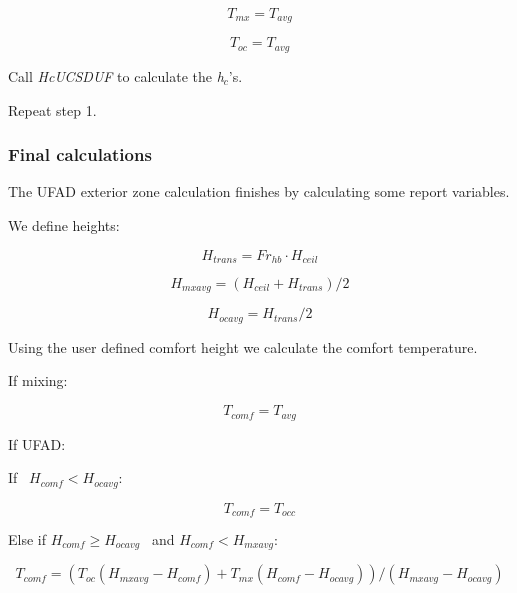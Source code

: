 \begin{equation}
{T_{mx}} = {T_{avg}}
\end{equation}

\begin{equation}
{T_{oc}} = {T_{avg}}
\end{equation}

Call \emph{HcUCSDUF} to calculate the \emph{h\(_{c}\)}'s.

Repeat step 1.

\subsubsection{Final calculations}\label{final-calculations-2}

The UFAD exterior zone calculation finishes by calculating some report variables.

We define heights:

\begin{equation}
{H_{trans}} = F{r_{hb}} \cdot {H_{ceil}}
\end{equation}

\begin{equation}
{H_{mxavg}} = \left( {{H_{ceil}} + {H_{trans}}} \right)/2
\end{equation}

\begin{equation}
{H_{ocavg}} = {H_{trans}}/2
\end{equation}

Using the user defined comfort height we calculate the comfort temperature.

If mixing:

\begin{equation}
{T_{comf}} = {T_{avg}}
\end{equation}

If UFAD:

If~ \({H_{comf}} < {H_{ocavg}}\):

\begin{equation}
{T_{comf}} = {T_{occ}}
\end{equation}

Else if \({H_{comf}} \ge {H_{ocavg}}\) ~and \({H_{comf}} < {H_{mxavg}}\):

\begin{equation}
{T_{comf}} = \left( {{T_{oc}}\left( {{H_{mxavg}} - {H_{comf}}} \right) + {T_{mx}}\left( {{H_{comf}} - {H_{ocavg}}} \right)} \right)/\left( {{H_{mxavg}} - {H_{ocavg}}} \right)
\end{equation}

